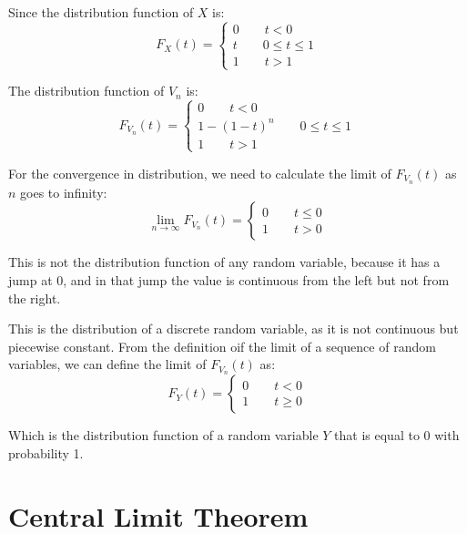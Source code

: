 Since the distribution function of $X$ is:
\[
F_X(t) = \begin{cases}
    0 \qquad t < 0 \\
    t \qquad 0 \leq t \leq 1 \\
    1 \qquad t > 1
\end{cases}
\]

The distribution function of $V_n$ is:
\[
F_{V_n}(t) = \begin{cases}
    0 \qquad t < 0 \\
    1 - (1-t)^n \qquad 0 \leq t \leq 1 \\
    1 \qquad t > 1
\end{cases}
\]

For the convergence in distribution, we need to calculate the limit of $F_{V_n}(t)$ as $n$ goes to infinity:
\[
\lim_{n \to \infty} F_{V_n}(t) = \begin{cases}
    0 \qquad t \leq 0 \\
    1 \qquad t > 0
\end{cases}
\]

This is not the distribution function of any random variable, because it has a jump at 0, and in that jump the value is continuous from the left but not from the right.

This is the distribution of a discrete random variable, as it is not continuous but piecewise constant.
From the definition oif the limit of a sequence of random variables, we can define the limit of $F_{V_n}(t)$ as:
\[
F_Y(t) = \begin{cases}
    0 \qquad t < 0 \\
    1 \qquad t \geq 0
\end{cases}
\]

Which is the distribution function of a random variable $Y$ that is equal to 0 with probability 1.

\section{Central Limit Theorem}

